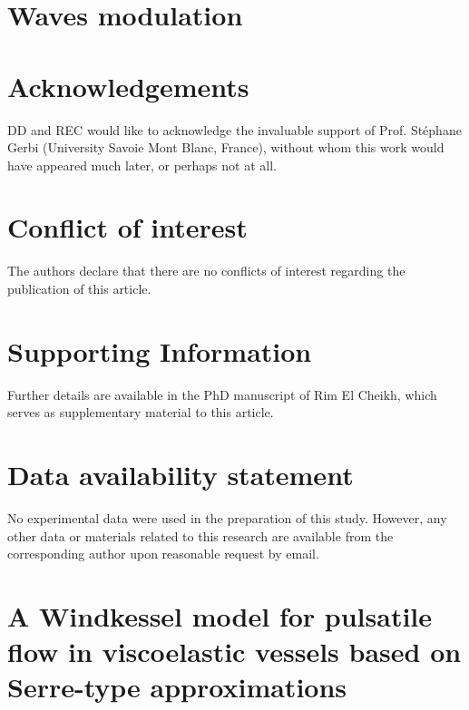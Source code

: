 \documentclass[alpha-refs, 12pt]{wiley-article}
\begin{document}
\section{Waves modulation}



\vspace*{1.5em}
\section*{Acknowledgements}

DD and REC would like to acknowledge the invaluable support of Prof. St\'ephane Gerbi (University Savoie Mont Blanc, France), without whom this work would have appeared much later, or perhaps not at all.

\section*{Conflict of interest}

The authors declare that there are no conflicts of interest regarding the publication of this article.

\section*{Supporting Information}

Further details are available in the PhD manuscript of Rim El Cheikh, which serves as supplementary material to this article.

\section*{Data availability statement}

No experimental data were used in the preparation of this study. However, any other data or materials related to this research are available from the corresponding author upon reasonable request by email.

\printendnotes

\printglossary[type=\acronymtype]



\appendix
\section{A Windkessel model for pulsatile flow in viscoelastic vessels based on Serre-type approximations}\label{sec:windkessel}
\end{document}
